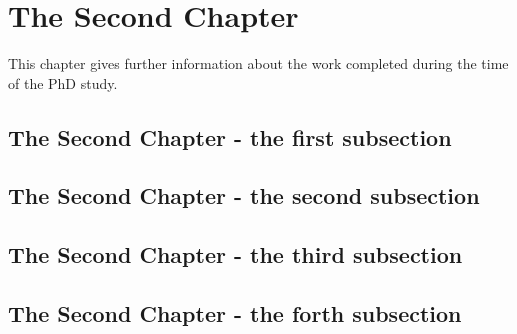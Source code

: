 \chapter{The Second Chapter}
    \minitoc
    \vfill
    \begin{mybox}
        This chapter gives further information about the work completed during the time of the PhD study.\\
        \blindtext[2]
    \end{mybox}
    \newpage
    \blindtext[10]
    \newpage
    \section{The Second Chapter - the first subsection}
        \blindtext[10] 
        \newpage
    \section{The Second Chapter - the second subsection}
        \blindtext[10] 
        \newpage
    \section{The Second Chapter - the third subsection}
        \blindtext[10] 
        \newpage
    \section{The Second Chapter - the forth subsection}
        \blindtext[10] 
        \newpage